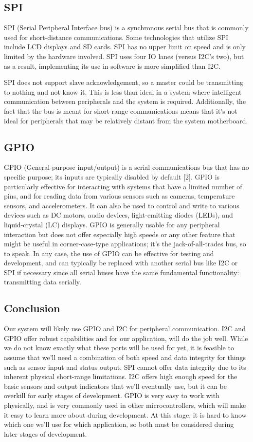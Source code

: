 \documentclass[letterpaper,10pt,serif,draftclsnofoot,onecolumn,compsoc,titlepage]{IEEEtran}
\begin{document}
\subsection{SPI}
SPI (Serial Peripheral Interface bus) is a synchronous serial bus that is commonly used for short-distance communications. Some technologies that utilize SPI include LCD displays and SD cards. SPI has no upper limit on speed and is only limited by the hardware involved. SPI uses four IO lanes (versus I2C's two), but as a result, implementing its use in software is more simplified than I2C. 

SPI does not support slave acknowledgement, so a master could be transmitting to nothing and not know it. This is less than ideal in a system where intelligent communication between peripherals and the system is required. Additionally, the fact that the bus is meant for short-range communications means that it's not ideal for peripherals that may be relatively distant from the system motherboard.

\subsection{GPIO}
GPIO (General-purpose input/output) is a serial communications bus that has no specific purpose; its inputs are typically disabled by default [2]. GPIO is particularly effective for interacting with systems that have a limited number of pins, and for reading data from various sensors such as cameras, temperature sensors, and accelerometers. It can also be used to control and write to various devices such as DC motors, audio devices, light-emitting diodes (LEDs), and liquid-crystal (LC) displays. GPIO is generally usable for any peripheral interaction but does not offer especially high speeds or any other feature that might be useful in corner-case-type applications; it's the jack-of-all-trades bus, so to speak. In any case, the use of GPIO can be effective for testing and development, and can typically be replaced with another serial bus like I2C or SPI if necessary since all serial buses have the same fundamental functionality: transmitting data serially.

\subsection{Conclusion}
Our system will likely use GPIO and I2C for peripheral communication. I2C and GPIO offer robust capabilities and for our application, will do the job well. While we do not know exactly what these ports will be used for yet, it is feasible to assume that we'll need a combination of both speed and data integrity for things such as sensor input and status output. SPI cannot offer data integrity due to its inherent physical short-range limitations. I2C offers high enough speed for the basic sensors and output indicators that we'll eventually use, but it can be overkill for early stages of development. GPIO is very easy to work with physically, and is very commonly used in other microcontrollers, which will make it easy to learn more about during development. At this stage, it is hard to know which one we'll use for which application, so both must be considered during later stages of development.
\end{document}
